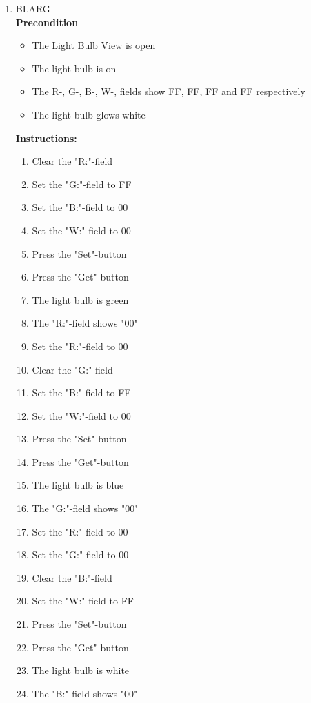 \documentclass[a4paper]{article}
\newlength{\testlabellength}
\newenvironment{testlist}{\begin{enumerate}[label=\bfseries Instruction \thesubsection.\arabic* , labelindent=0pt, labelwidth=\testlabellength , leftmargin=2cm]}{\end{enumerate}}
\newenvironment{precondition}{
{\color{white}BLARG}\\ 
\textbf{Precondition}
\begin{itemize}[labelindent=0cm, labelwidth=2cm , leftmargin=1cm]
}
{\end{itemize}}
\newenvironment{instruction}{
\textbf{Instructions:}
\begin{enumerate}[label=\bfseries  \arabic*., labelindent=0cm, labelwidth=2cm , leftmargin=1cm]
}
{\end{enumerate}}
\begin{document}
\begin{appendices}
\begin{testlist}


	\item
		\begin{precondition}
			\item The Light Bulb View is open
			\item The light bulb is on
			\item The R-, G-, B-, W-, fields show FF, FF, FF and FF respectively
			\item The light bulb glows white
		\end{precondition}
		\begin{instruction}
			\item Clear the "R:"-field
			\item Set the "G:"-field to FF
			\item Set the "B:"-field to 00
			\item Set the "W:"-field to 00
			\item Press the "Set"-button
			\item Press the "Get"-button
			\item The light bulb is green
			\item The "R:"-field shows "00"
			
			\item Set the "R:"-field to 00
			\item Clear the "G:"-field
			\item Set the "B:"-field to FF
			\item Set the "W:"-field to 00
			\item Press the "Set"-button
			\item Press the "Get"-button
			\item The light bulb is blue
			\item The "G:"-field shows "00"
			
			\item Set the "R:"-field to 00
			\item Set the "G:"-field to 00
			\item Clear the "B:"-field
			\item Set the "W:"-field to FF
			\item Press the "Set"-button
			\item Press the "Get"-button
			\item The light bulb is white
			\item The "B:"-field shows "00"
			

\end{instruction}
\end{testlist}
\end{appendices}
\end{document}
